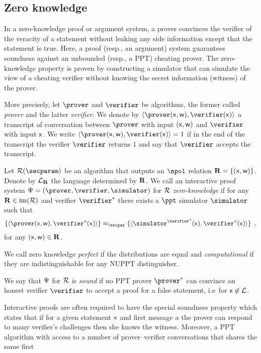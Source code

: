 \documentclass[runningheads]{llncs}
\theoremstyle{definition}
\begin{document}
\subsection{Zero knowledge}
In a zero-knowledge proof or argument system, a prover convinces the verifier of the veracity of a statement without leaking any side information except that the statement is true.
Here, a proof (resp., an argument) system guarantees soundness against an unbounded (resp., a PPT) cheating prover.
The zero-knowledge property is proven by constructing a simulator that can simulate the view of a cheating verifier without knowing the secret information (witness) of the prover.

More precisely, let $\prover$ and $\verifier$ be algorithms, the former called \emph{prover} and the latter \emph{verifier}. 
We denote by $\ip{\prover (\inp, \wit)}{\verifier (\inp)}$ a transcript of conversation between $\prover$ with input $(\mathsf{x}, \mathsf{w})$ and $\verifier$ with input $\mathsf{x}$. We write $\ip{\prover (\inp, \wit)}{\verifier (\inp)} = 1$ if in the end of the transcript the verifier $\verifier$ returns $1$ and say that $\verifier$ accepts the transcript.

Let $\RELGEN(\secparam)$ be an algorithm that outputs an $\npol$ relation $\mathbf{R} = \{(\mathsf{x}, \mathsf{w})\}$. Denote by $\mathcal{L}_{\mathbf{R}}$ the language determined by $\mathbf{R}$.
We call an interactive proof system $\proofsystem = (\prover, \verifier, \simulator)$ for $\mathcal{R}$  \emph{zero-knowledge} if for any $\mathbf{R} \in \operatorname{im}(\mathcal{R})$ and verifier $\verifier^*$ there exists a $\ppt$ simulator $\simulator$ such that
\[
  \smallset{\ip{\prover (\inp, \wit)}{\verifier^{*}(\inp)}} \approx_\secpar \smallset{\ip{\simulator^{\verifier^{*}} (\inp)}{\verifier^{*}(\inp)}}\enspace,
\]
for any $(\mathsf{x}, \mathsf{w}) \in \mathbf{R}$.

We call zero knowledge \emph{perfect} if the distributions are equal and \emph{computational} if they are indistinguishable for any NUPPT distinguisher.

We say that $\Psi$ for $\mathcal{R}$ is \emph{sound} if no PPT prover $\prover^*$ can convince an honest verifier $\verifier$ to accept a proof for a false statement, i.e~for $\mathsf{x} \not\in\mathcal{L}$.

Interactive proofs are often required to have the special soundness property which states that if for a given statement $\mathsf{x}$ and first message $a$ the prover can respond to many verifier's challenges then she knows the witness. Moreover, a PPT algorithm with access to a number of prover--verifier conversations that shares the same first
\end{document}
